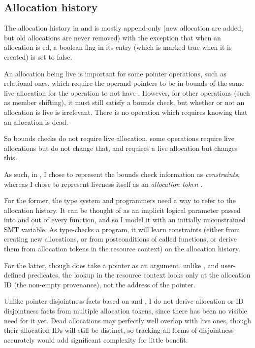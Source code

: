 \subsection{Allocation history}\label{subsec:alloc-history}

The allocation history in  and  is mostly append-only
(new allocation are added, but old allocations are never removed) with the
exception that when an allocation is ed, a boolean flag in its
entry (which is marked true when it is created) is set to false.

An allocation being live is important for some pointer operations, such as
relational ones, which require the operand pointers to be in bounds of the same
live allocation for the operation to not have . However, for other
operations (such as member shifting), it must still satisfy a bounds check, but
whether or not an allocation is live is irrelevant. There is no operation which
requires knowing that an allocation is dead.

So bounds checks do not require live allocation, some operations require
live allocations but do not change that, and  requires
a live allocation but changes this.

As such, in , I chose to represent the bounds check information as
\emph{constraints}, whereas I chose to represent liveness itself as an
\emph{allocation token} .

For the former, the type system and programmers need a way to refer to the
allocation history. It can be thought of as an implicit logical parameter
passed into and out of every function, and so I model it with an initially
unconstrained SMT variable. As  type-checks a  program, it
will learn constraints (either from creating new allocations, or from
postconditions of called functions, or derive them from allocation tokens in
the resource context) on the allocation history.

For the latter, though  does take a pointer as an argument,
unlike ,  and user-defined predicates, the
lookup in the resource context looks only at the allocation ID (the non-empty
provenance), not the address of the pointer.

Unlike pointer disjointness facts based on  and
, I do not derive allocation or ID disjointness facts from
multiple allocation tokens, since there has been no visible need for it
yet.\label{sn:ptr-eq-annotation} Dead allocations may perfectly well overlap
with live ones, though their allocation IDs will still be distinct, so tracking
all forms of disjointness accurately would add significant complexity for
little benefit.

